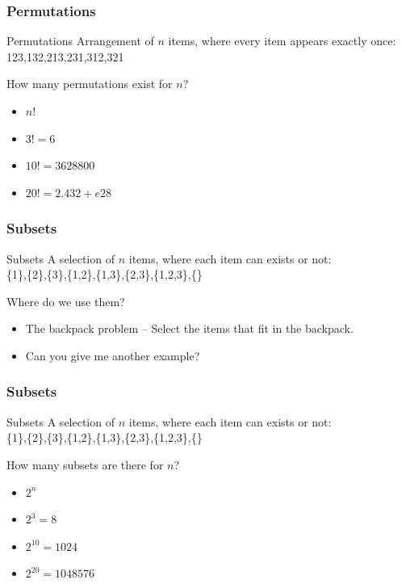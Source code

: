 \documentclass{beamer}
\begin{document}
\begin{frame}
  \frametitle{Permutations}
  \begin{block}{Permutations}
    Arrangement of $n$ items, where every item appears exactly once:\\
    123,132,213,231,312,321
  \end{block}
  \vfill

  \begin{block}{How many permutations exist for $n$?}
  \begin{itemize}
  \item<2> $n!$
    \smallskip
    
  \item<2> $3! = 6$
  \item<2> $10! = 3 628 800$
  \item<2> $20! = 2.432 +e28$
  \end{itemize}
  \end{block}
\end{frame}

\begin{frame}
  \frametitle{Subsets}
  \begin{block}{Subsets}
    A selection of $n$ items, where each item can exists or not:\\
    \{1\},\{2\},\{3\},\{1,2\},\{1,3\},\{2,3\},\{1,2,3\},\{\}
  \end{block}
  \vfill

  \begin{block}{Where do we use them?}
    \begin{itemize}
    \item The backpack problem -- Select the items that fit in the backpack.
    \item Can you give me another example?
    \end{itemize}
  \end{block}
\end{frame}

\begin{frame}
  \frametitle{Subsets}
  \begin{block}{Subsets}
    A selection of $n$ items, where each item can exists or not:\\
    \{1\},\{2\},\{3\},\{1,2\},\{1,3\},\{2,3\},\{1,2,3\},\{\}
  \end{block}
  \vfill
  \begin{block}{How many subsets are there for $n$?}
  \begin{itemize}
  \item<2> $2^n$
    \smallskip
    
  \item<2> $2^3 = 8$
  \item<2> $2^{10} = 1024$
  \item<2> $2^{20} = 1 048 576$
  \end{itemize}
  \end{block}
\end{frame}
\end{document}
